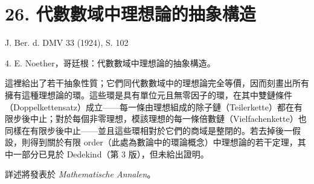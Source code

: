 \documentclass[11pt]{article}
\begin{document}
\section*{26. 代數數域中理想論的抽象構造}

\begin{center}
J. Ber. d. DMV 33 (1924), S. 102
\end{center}

4. E. Noether，哥廷根：代數數域中理想論的抽象構造。

這裡給出了若干抽象性質；它們同代數數域中的理想論完全等價，因而刻畫出所有擁有這種理想論的環。這些環是具有單位元且無零因子的環，在其中雙鏈條件（Doppelkettensatz）成立——每一條由理想組成的除子鏈（Teilerkette）都在有限步後中止；對於每個非零理想，模該理想的每一條倍數鏈（Vielfachenkette）也同樣在有限步後中止——並且這些環相對於它們的商域是整閉的。若去掉後一假設，則得到關於有限 order（此處為數論中的環論概念）中理想論的若干定理，其中一部分已見於 Dedekind（第 3 版），但未給出證明。

詳述將發表於 \emph{Mathematische Annalen}。
\end{document}
